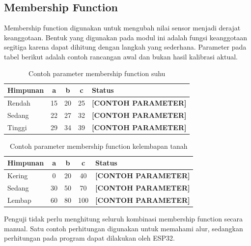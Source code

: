 \documentclass[12pt,a4paper]{article}
\begin{document}
\subsection{Membership Function}

Membership function digunakan untuk mengubah nilai sensor menjadi derajat keanggotaan. Bentuk yang digunakan pada modul ini adalah fungsi keanggotaan segitiga karena dapat dihitung dengan langkah yang sederhana. Parameter pada tabel berikut adalah contoh rancangan awal dan bukan hasil kalibrasi aktual.

\begin{table}[H]
    \centering
    \caption{Contoh parameter membership function suhu}
    \label{tab:mfsuhu}
    \begin{tabularx}{\textwidth}{l c c c X}
        \toprule
        \textbf{Himpunan} & \textbf{a} & \textbf{b} & \textbf{c} & \textbf{Status} \\
        \midrule
        Rendah & 15 & 20 & 25 & \textbf{[CONTOH PARAMETER]} \\
        Sedang & 22 & 27 & 32 & \textbf{[CONTOH PARAMETER]} \\
        Tinggi & 29 & 34 & 39 & \textbf{[CONTOH PARAMETER]} \\
        \bottomrule
    \end{tabularx}
\end{table}

\begin{table}[H]
    \centering
    \caption{Contoh parameter membership function kelembapan tanah}
    \label{tab:mfsoil}
    \begin{tabularx}{\textwidth}{l c c c X}
        \toprule
        \textbf{Himpunan} & \textbf{a} & \textbf{b} & \textbf{c} & \textbf{Status} \\
        \midrule
        Kering & 0 & 20 & 40 & \textbf{[CONTOH PARAMETER]} \\
        Sedang & 30 & 50 & 70 & \textbf{[CONTOH PARAMETER]} \\
        Lembap & 60 & 80 & 100 & \textbf{[CONTOH PARAMETER]} \\
        \bottomrule
    \end{tabularx}
\end{table}



Penguji tidak perlu menghitung seluruh kombinasi membership function secara manual. Satu contoh perhitungan digunakan untuk memahami alur, sedangkan perhitungan pada program dapat dilakukan oleh ESP32.
\end{document}
